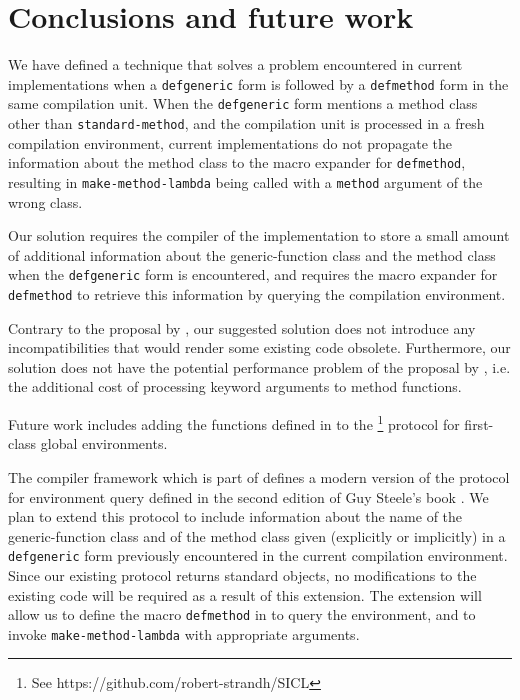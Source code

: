 \section{Conclusions and future work}
\label{sec-conclusions}

We have defined a technique that solves a problem encountered in
current \commonlisp{} implementations when a \texttt{defgeneric} form
is followed by a \texttt{defmethod} form in the same compilation
unit.  When the \texttt{defgeneric} form mentions a method class other
than \texttt{standard-method}, and the compilation unit is processed
in a fresh compilation environment, current implementations do not
propagate the information about the method class to the macro expander
for \texttt{defmethod}, resulting in \texttt{make-method-lambda} being
called with a \texttt{method} argument of the wrong class.

Our solution requires the compiler of the \commonlisp{} implementation
to store a small amount of additional information about the
generic-function class and the method class when the
\texttt{defgeneric} form is encountered, and requires the macro
expander for \texttt{defmethod} to retrieve this information by
querying the compilation environment.

Contrary to the proposal by \cnh{}, our suggested solution does not
introduce any incompatibilities that would render some existing code
obsolete.  Furthermore, our solution does not have the potential
performance problem of the proposal by \cnh{}, i.e. the additional
cost of processing keyword arguments to method functions.

Future work includes adding the functions defined in
 to the \sicl{}%
\footnote{See https://github.com/robert-strandh/SICL} protocol for
first-class global environments.

The \cleavir{} compiler framework which is part of \sicl{} defines a
modern version of the protocol for environment query defined in the
second edition of Guy Steele's book \cite{Steele:1990:CLL:95411}.  We
plan to extend this protocol to include information about the name of
the generic-function class and of the method class given (explicitly
or implicitly) in a \texttt{defgeneric} form previously encountered in
the current compilation environment.  Since our existing protocol
returns standard objects, no modifications to the existing \cleavir{}
code will be required as a result of this extension.  The extension
will allow us to define the macro \texttt{defmethod} in \sicl{} to
query the environment, and to invoke \texttt{make-method-lambda} with
appropriate arguments.
